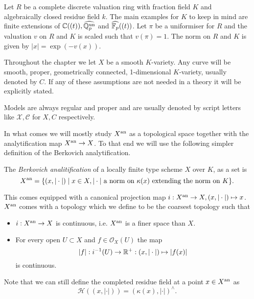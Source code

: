 Let $R$ be a complete discrete valuation ring with fraction field $K$ and algebraically closed residue field $k$. 
The main examples for $K$ to keep in mind are finite extensions of $\mathbb{C}((t)), \widehat{\mathbb{Q}_p^{\text{un}}} $ and $\widehat{\mathbb{F}_p}((t))$.  
Let $\pi$ be a uniformiser for $R$ and the valuation $v$ on $R$ and $K$ is scaled such that $v(\pi) = 1$. 
The norm on $R$ and $K$ is given by $|x| = \exp(-v(x))$. 

Throughout the chapter we let $X$ be a smooth $K$-variety. 
Any curve will be smooth, proper, geometrically connected, 1-dimensional $K$-variety, usually denoted by $C$. 
If any of these assumptions are not needed in a theory it will be explicitly stated. 

Models are always regular and proper and are usually denoted by script letters like $\mathscr X, \mathscr C$ for $X, C$ respectively.  


In what comes we will mostly study $X{}^{\text{an}}$ as a topological space together with the analytification map $X{}^{\text{an}} \to X$. 
To that end we will use the following simpler definition of the Berkovich analytification.

\begin{definition}\label{def:berkovich_analytification_explicit}
	The \emph{Berkovich analitification} of a locally finite type scheme $X$ over  $K$, as a set is \[
		X{}^{\text{an}} = \{(x, |\cdot |)  \mid x\in X, |\cdot | \text{ a norm on } \kappa(x) \text{ extending the norm on }K \} 
	.\] 

	This comes equipped with a canonical projection map $i: X{}^{\text{an}} \to X, (x, |\cdot |) \mapsto  x$.
	$X{}^{\text{an}} $ comes with a topology which we define to be the coarsest topology such that 
	\begin{itemize}
		\item $i: X{}^{\text{an}} \to X$ is continuous, i.e. $X{}^{\text{an}}$ is a finer space than  $X$. 
		\item For every open $U \subset X$ and $f \in \mathcal{O}_X(U)$ the map  \[
				|f|: i^{-1}(U) \to \mathbb{R}^{+}: (x, |\cdot |) \mapsto  |f(x)|
		\] 
		is continuous.
	\end{itemize}
\end{definition}
Note that we can still define the completed residue field at a point $x \in X{}^{\text{an}}$ as \[
	\mathcal{H} ((x, |\cdot |)) = (\kappa(x), |\cdot |)^{\wedge}
.\] 
